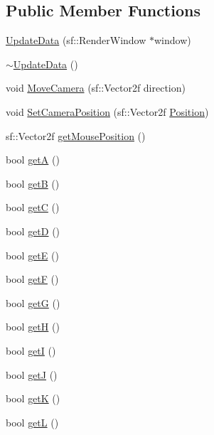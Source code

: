 \subsection*{Public Member Functions}
\begin{DoxyCompactItemize}
\item 
\hyperlink{class_update_data_a6882b130592cc63aa1e6f1ea36dcf349}{Update\-Data} (sf\-::\-Render\-Window $\ast$window)
\item 
\hyperlink{class_update_data_ab2e57f8fd741b289c7719ab860706ff6}{$\sim$\-Update\-Data} ()
\item 
void \hyperlink{class_update_data_a2ff2fe51ef63293e7d4e831cc95b0837}{Move\-Camera} (sf\-::\-Vector2f direction)
\item 
void \hyperlink{class_update_data_a17324f6ed80111443fef3da6208fb6bc}{Set\-Camera\-Position} (sf\-::\-Vector2f \hyperlink{_chunk_8hpp_ab91b34ae619fcdfcba4522b4f335bf83}{Position})
\item 
sf\-::\-Vector2f \hyperlink{class_update_data_a81f654ff6f0879b2c3129662801232ec}{get\-Mouse\-Position} ()
\item 
bool \hyperlink{class_update_data_a34912b36f314c985f9f725acae8bfb87}{get\-A} ()
\item 
bool \hyperlink{class_update_data_a0485ded87f129d052690ba237b1e41dd}{get\-B} ()
\item 
bool \hyperlink{class_update_data_a8a116007d883d35dbdb39eca6d22b80a}{get\-C} ()
\item 
bool \hyperlink{class_update_data_aa9bebf60b7c0d589271abf0c7c5195f4}{get\-D} ()
\item 
bool \hyperlink{class_update_data_aba4e9499df698ad2106d578e424bcdbd}{get\-E} ()
\item 
bool \hyperlink{class_update_data_a850bc599ed356ae2011fa2f1039799e8}{get\-F} ()
\item 
bool \hyperlink{class_update_data_ab9214503a879098cd82758290787358f}{get\-G} ()
\item 
bool \hyperlink{class_update_data_abffec139846bbb6e399b95a714589036}{get\-H} ()
\item 
bool \hyperlink{class_update_data_ac2b180b0169806c7a28cc61eaf8c8524}{get\-I} ()
\item 
bool \hyperlink{class_update_data_a50376e12eaa0421bf9ddc45fb38c2f3e}{get\-J} ()
\item 
bool \hyperlink{class_update_data_a833401513efc900ea16ebbca9c6c376f}{get\-K} ()
\item 
bool \hyperlink{class_update_data_a9fb4adb79c29ab471cd20e545369e461}{get\-L} ()

\end{DoxyCompactItemize}
